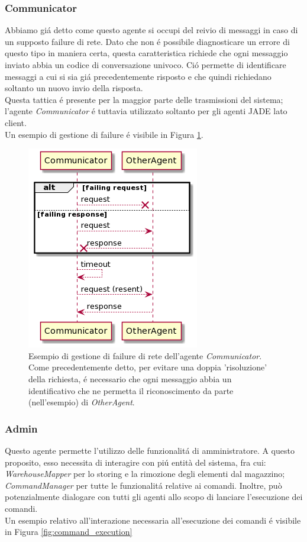 \subsubsection{Communicator}
Abbiamo gi\'a detto come questo agente si occupi del reivio di messaggi in caso di un supposto failure di rete. Dato che non \'e possibile diagnosticare un errore di questo tipo in maniera certa, questa caratteristica richiede che ogni messaggio inviato abbia un codice di conversazione univoco. Ci\'o permette di identificare messaggi a cui si sia gi\'a precedentemente risposto e che quindi richiedano soltanto un nuovo invio della risposta.\\
Questa tattica \'e presente per la maggior parte delle trasmissioni del sistema; l'agente \textit{Communicator} \'e tuttavia utilizzato soltanto per gli agenti JADE lato client.\\
Un esempio di gestione di failure \'e visibile in Figura \ref{fig:communicator_sequence_diagram}.
\begin{figure}[ht]\centering
    \includegraphics[width=.5\textwidth]{section/design/figure/agent/communicator_interaction.png}
    \caption{Esempio di gestione di failure di rete dell'agente \textit{Communicator}. Come precedentemente detto, per evitare una doppia 'risoluzione' della richiesta, \'e necessario che ogni messaggio abbia un identificativo che ne permetta il riconoscimento da parte (nell'esempio) di \textit{OtherAgent}.}
    \label{fig:communicator_sequence_diagram}
\end{figure}

\subsubsection{Admin}
Questo agente permette l'utilizzo delle funzionalit\'a di amministratore. A questo proposito, esso necessita di interagire con pi\'u entità del sistema, fra cui: \textit{WarehouseMapper} per lo storing e la rimozione degli elementi dal magazzino; \textit{CommandManager} per tutte le funzionalit\'a relative ai comandi. Inoltre, può potenzialmente dialogare con tutti gli agenti allo scopo di lanciare l'esecuzione dei comandi.\\
Un esempio relativo all'interazione necessaria all'esecuzione dei comandi \'e visibile in Figura \ref{fig:command_execution}

